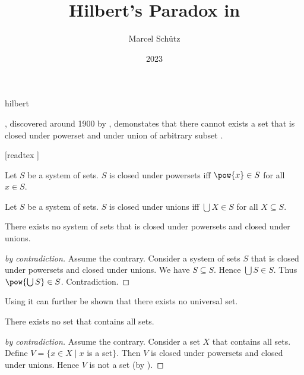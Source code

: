 \documentclass{stex}
\begin{document}
\title{Hilbert's Paradox in \Naproche}
\author{Marcel Schütz}
\date{2023}
\maketitle
\begin{smodule}{hilbert}
\begin{sparagraph}
  \noindent \emph{}, discovered around 1900 by , demonstates that there cannot exists a set that is closed under powerset and under union of arbitrary subset \cite{PeckhausKahl2002}.
\end{sparagraph}

\begin{forthel}
  [readtex ]

  \begin{definition*}
    Let $S$ be a system of sets.
    $S$ is closed under powersets iff $\pow{x} \in S$ for all $x \in S$.
  \end{definition*}

  \begin{definition*}
    Let $S$ be a system of sets.
    $S$ is closed under unions iff $\bigcup X \in S$ for all $X \subseteq S$.
  \end{definition*}

  \begin{theorem*}\label{hilbert_paradox}
    There exists no system of sets that is closed under powersets and closed under unions.
  \end{theorem*}
  \begin{proof}[ by contradiction]
    Assume the contrary.
    Consider a system of sets $S$ that is closed under powersets and closed under unions.
    We have $S \subseteq S$.
    Hence $\bigcup S \in S$.
    Thus $\pow{\bigcup S} \in S$.
    Contradiction.
  \end{proof}
\end{forthel}

\begin{sparagraph}
  \noindent Using  it can further be shown that there exists no universal set.
\end{sparagraph}

\begin{forthel}
  \begin{corollary*}
    There exists no set that contains all sets.
  \end{corollary*}
  \begin{proof}[ by contradiction]
    Assume the contrary.
    Consider a set $X$ that contains all sets.
    Define $V = \{ x \in X \mid x$ is a set$\}$.
    Then $V$ is closed under powersets and closed under unions.
    Hence $V$ is not a set (by ).
  \end{proof}
\end{forthel}
\end{smodule}
\printbibliography
\end{document}

